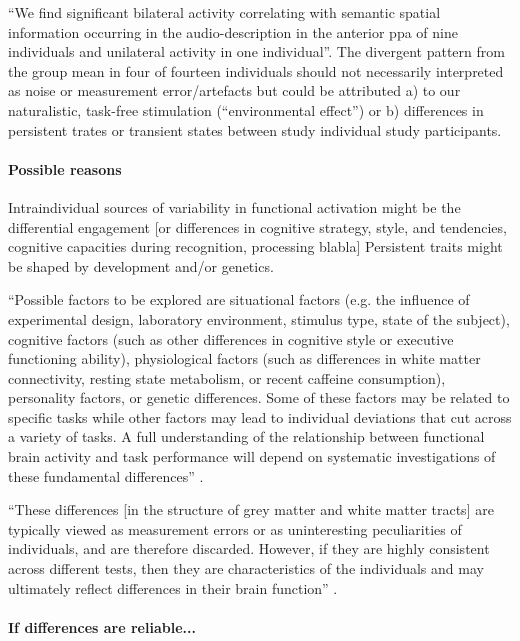 ``We find significant bilateral activity correlating with semantic spatial
information occurring in the audio-description in the anterior \ac{ppa} of nine
individuals and unilateral activity in one individual''.
%
The divergent pattern from the group mean in four of fourteen individuals should
not necessarily interpreted as noise or measurement error/artefacts but could be
attributed a) to our naturalistic, task-free stimulation (``environmental
effect'') or b) differences in persistent trates or transient states between
study individual study participants.


\paragraph{Possible reasons}

%
Intraindividual sources of variability in functional activation might be the
differential engagement [or differences in cognitive strategy,
style, and tendencies, cognitive capacities during recognition, processing
blabla]
%
Persistent traits might be shaped by development and/or genetics.

%
``Possible factors to be explored are situational factors (e.g. the influence of
experimental design, laboratory environment, stimulus type, state of the
subject), cognitive factors (such as other differences in cognitive style or
executive functioning ability), physiological factors (such as differences in
white matter connectivity, resting state metabolism, or recent caffeine
consumption), personality factors, or genetic differences.
%
Some of these factors may be related to specific tasks while other factors may
lead to individual deviations that cut across a variety of tasks.
%
A full understanding of the relationship between functional brain activity and
task performance will depend on systematic investigations of these fundamental
differences'' \citep{vanhorn2008individual}.


``These differences [in the structure of grey matter and white matter tracts]
are typically viewed as measurement errors or as uninteresting peculiarities of
individuals, and are therefore discarded.
%
However, if they are highly consistent across different tests, then they are
characteristics of the individuals and may ultimately reflect differences in
their brain function'' \citep{kanai2011structural}.



\paragraph{If differences are reliable...}

